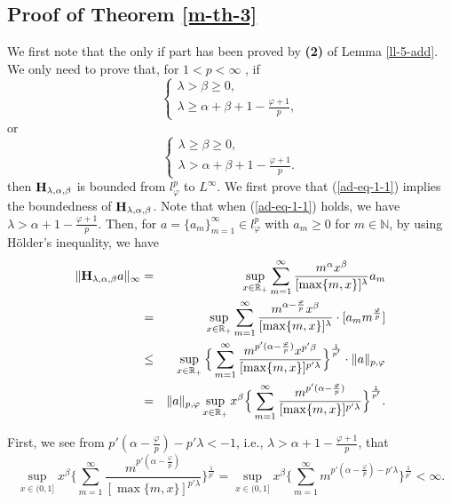 \documentclass[10pt]{amsart}
\theoremstyle{definition}    %
\numberwithin{equation}{section}
\begin{document}
\subsection{{\bf Proof of Theorem \ref{m-th-3}}}
We first note that the only if part has been proved by {\bf (2)} of Lemma \ref{ll-5-add}.  We only need to prove that, for $1<p<\infty$ , if 
\begin{equation}\label{ad-eq-1-1}
\begin{cases}
\lambda>\beta\geq 0, \\
\lambda\geq \alpha+\beta+1-\frac{\varphi+1}{p}, 
\end{cases}
\end{equation}
or
\begin{equation}\label{ad-eq-2-1}
\begin{cases}
\lambda\geq \beta\geq 0, \\
\lambda>\alpha+\beta+1-\frac{\varphi+1}{p}.
\end{cases}
\end{equation}
then ${\bf H}_{\lambda, \alpha, \beta}$ is bounded from $l_{\varphi}^{p}$ to $L^{\infty}$.  We first prove that (\ref{ad-eq-1-1}) implies the boundedness of ${\bf H}_{\lambda, \alpha, \beta}$. Note that when (\ref{ad-eq-1-1}) holds, we have  $\lambda>\alpha+1-\frac{\varphi+1}{p}$. Then, for $a=\{a_m\}_{m=1}^{\infty}\in l_{\varphi}^p$ with $a_m\geq 0$ for $m\in \mathbb{N}$, by using H\"{o}lder's inequality, we have
\begin{eqnarray}\label{a-1}
\|{\bf H}_{\lambda, \alpha, \beta}a\|_{\infty}&=&\sup_{x\in \mathbb{R}_{+}}\sum_{m=1}^{\infty}\frac{m^{\alpha}x^{\beta}}{[\max\{m,x\}]^{\lambda}}a_m \\
&=&\sup_{x\in \mathbb{R}_{+}}\sum_{m=1}^{\infty}\frac{m^{\alpha-\frac{\varphi}{p}}x^{\beta}}{[\max\{m,x\}]^{\lambda}}\cdot[a_m m^{\frac{\varphi}{p}}] \nonumber \\
&\leq & \sup_{x\in \mathbb{R}_{+}}\Big\{\sum_{m=1}^{\infty}\frac{m^{p'(\alpha-\frac{\varphi}{p})}x^{p'\beta}}{[\max\{m,x\}]^{p'\lambda}}\Big\}^{\frac{1}{p'}}\cdot\|a\|_{p, \varphi}\nonumber \\
&=& \|a\|_{p, \varphi}\sup_{x\in \mathbb{R}_{+}}x^{\beta}\Big\{\sum_{m=1}^{\infty}\frac{m^{p'(\alpha-\frac{\varphi}{p})}}{[\max\{m,x\}]^{p'\lambda}}\Big\}^{\frac{1}{p'}}.\nonumber
\end{eqnarray}

First, we see from $p'(\alpha-\frac{\varphi}{p})-p'\lambda<-1$, i.e., $\lambda>\alpha+1-\frac{\varphi+1}{p}$, that
\begin{equation}\label{a-2}
\sup_{x\in (0,1]}x^{\beta}\Big\{\sum_{m=1}^{\infty}\frac{m^{p'(\alpha-\frac{\varphi}{p})}}{[\max\{m,x\}]^{p'\lambda}}\Big\}^{\frac{1}{p'}}=\sup_{x\in (0,1]}x^{\beta}\Big\{\sum_{m=1}^{\infty}{m^{p'(\alpha-\frac{\varphi}{p})-p'\lambda}}\Big\}^{\frac{1}{p'}}<\infty. 
\end{equation}
\end{document}
